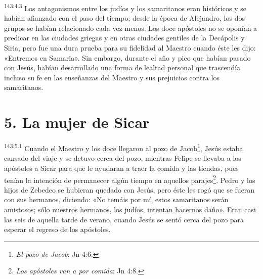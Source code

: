 \par 
\textsuperscript{143:4.3} Los antagonismos entre los judíos y los samaritanos eran históricos y se habían afianzado con el paso del tiempo; desde la época de Alejandro, los dos grupos se habían relacionado cada vez menos. Los doce apóstoles no se oponían a predicar en las ciudades griegas y en otras ciudades gentiles de la Decápolis y Siria, pero fue una dura prueba para su fidelidad al Maestro cuando éste les dijo: «Entremos en Samaria». Sin embargo, durante el año y pico que habían pasado con Jesús, habían desarrollado una forma de lealtad personal que trascendía incluso su fe en las enseñanzas del Maestro y sus prejuicios contra los samaritanos.

\section*{5. La mujer de Sicar}
\par 
\textsuperscript{143:5.1} Cuando el Maestro y los doce llegaron al pozo de Jacob\footnote{\textit{El pozo de Jacob}: Jn 4:6.}, Jesús estaba cansado del viaje y se detuvo cerca del pozo, mientras Felipe se llevaba a los apóstoles a Sicar para que le ayudaran a traer la comida y las tiendas, pues tenían la intención de permanecer algún tiempo en aquellos parajes\footnote{\textit{Los apóstoles van a por comida}: Jn 4:8.}. Pedro y los hijos de Zebedeo se hubieran quedado con Jesús, pero éste les rogó que se fueran con sus hermanos, diciendo: «No temáis por mí, estos samaritanos serán amistosos; sólo nuestros hermanos, los judíos, intentan hacernos daño». Eran casi las seis de aquella tarde de verano, cuando Jesús se sentó cerca del pozo para esperar el regreso de los apóstoles.

